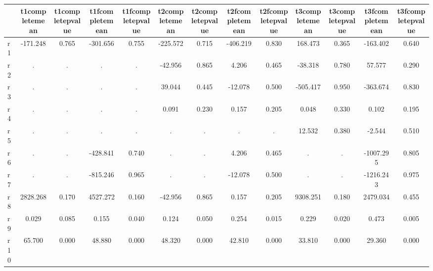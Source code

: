 \begin{table}[htbp]
\begin{tabular}{lcccccccccccc} \hline \hline
 & t1completemean  & t1completepvalue  & t1fcompletemean  & t1fcompletepvalue  & t2completemean  & t2completepvalue  & t2fcompletemean  & t2fcompletepvalue  & t3completemean  & t3completepvalue  & t3fcompletemean  & t3fcompletepvalue  \\  \hline 
r1 &  -171.248 &     0.765 &  -301.656 &     0.755 &  -225.572 &     0.715 &  -406.219 &     0.830 &   168.473 &     0.365 &  -163.402 &     0.640 \\  
r2 &         . &         . &         . &         . &   -42.956 &     0.865 &     4.206 &     0.465 &   -38.318 &     0.780 &    57.577 &     0.290 \\  
r3 &         . &         . &         . &         . &    39.044 &     0.445 &   -12.078 &     0.500 &  -505.417 &     0.950 &  -363.674 &     0.830 \\  
r4 &         . &         . &         . &         . &     0.091 &     0.230 &     0.157 &     0.205 &     0.048 &     0.330 &     0.102 &     0.195 \\  
r5 &         . &         . &         . &         . &         . &         . &         . &         . &    12.532 &     0.380 &    -2.544 &     0.510 \\  
r6 &         . &         . &  -428.841 &     0.740 &         . &         . &     4.206 &     0.465 &         . &         . & -1007.295 &     0.805 \\  
r7 &         . &         . &  -815.246 &     0.965 &         . &         . &   -12.078 &     0.500 &         . &         . & -1216.243 &     0.975 \\  
r8 &  2828.268 &     0.170 &  4527.272 &     0.160 &   -42.956 &     0.865 &     0.157 &     0.205 &  9308.251 &     0.180 &  2479.034 &     0.455 \\  
r9 &     0.029 &     0.085 &     0.155 &     0.040 &     0.124 &     0.050 &     0.254 &     0.015 &     0.229 &     0.020 &     0.473 &     0.005 \\  
r10 &    65.700 &     0.000 &    48.880 &     0.000 &    48.320 &     0.000 &    42.810 &     0.000 &    33.810 &     0.000 &    29.360 &     0.000 \\  
\hline \hline \end{tabular}
\end{table}
